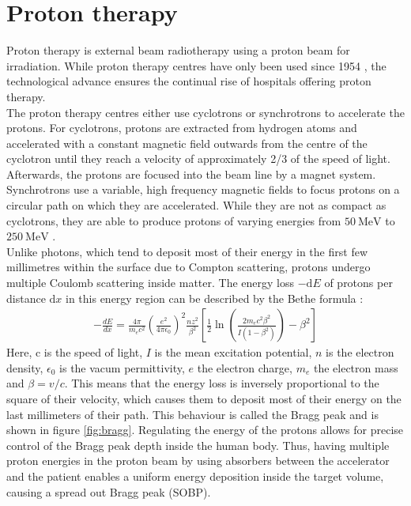 \section{Proton therapy}
Proton therapy is external beam radiotherapy using a proton beam for irradiation. While proton therapy centres have only been used since 1954 \cite{pct_history}, the technological
advance ensures the continual rise of hospitals offering proton therapy. \\
The proton therapy centres either use cyclotrons or synchrotrons to accelerate the protons. For cyclotrons, protons are extracted from hydrogen atoms and accelerated with
a constant magnetic field outwards from the centre of the cyclotron until they reach a velocity of approximately 2/3 of the speed of light. Afterwards, the protons
are focused into the beam line by a magnet system. Synchrotrons use a variable, high frequency magnetic fields to focus protons on a circular path on which they are accelerated. While they
are not as compact as cyclotrons, they are able to produce protons of varying energies from $\SI{50}{\MeV}$ to $\SI{250}{\MeV}$ \cite{cyclo}. \\
Unlike photons, which tend to deposit most of their energy in the first few millimetres within the surface due to Compton scattering,
protons undergo multiple Coulomb scattering inside matter.
The energy loss $-\text{d}E$ of protons per distance $\text{d}x$ in this energy region can be described by the Bethe formula \cite{bethe}:
\begin{align}
  - \frac{dE}{dx} = \frac{4\pi}{m_e c^2}\left(\frac{e^2}{4\pi\epsilon_0}\right)^2\frac{nz^2}{\beta^2} \left[ \frac{1}{2} \ln{\left(\frac{2 m_e c^2 \beta^2}{I(1-\beta^2)}\right)} - \beta^2 \right]
\end{align}
Here, c is the speed of light,  $I$ is the mean excitation potential, $n$ is the electron density, $\epsilon_0$ is the vacum permittivity, $e$ the electron charge,
$m_e$ the electron mass and $\beta = v/c$.
This means that the energy loss is inversely proportional to the square of their velocity, which causes them to deposit most of their energy on the last millimeters of their path.
This behaviour is called the Bragg peak and is shown in figure \ref{fig:bragg}.
Regulating the energy of the protons allows for precise control of the Bragg peak depth inside
the human body. Thus, having multiple proton energies in the proton beam by using absorbers between
the accelerator and the patient enables a uniform energy deposition inside the target volume, causing a spread out Bragg peak (SOBP).

